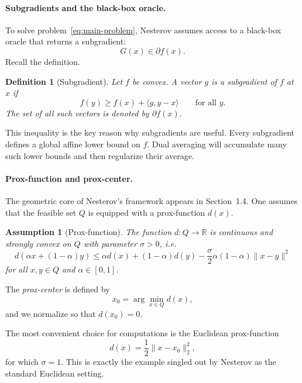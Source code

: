 \documentclass[12pt,a4paper]{article}
\newtheorem{definition}{Definition}
\newtheorem{assumption}{Assumption}
\begin{document}
\paragraph{Subgradients and the black-box oracle.}
To solve problem~\eqref{eq:main-problem}, Nesterov assumes access to a black-box oracle that returns a subgradient:
\begin{equation}
    G(x) \in \partial f(x).
\end{equation}
Recall the definition.

\begin{definition}[Subgradient]
Let $f$ be convex. A vector $g$ is a subgradient of $f$ at $x$ if
\begin{equation}
    f(y) \ge f(x) + \langle g, y-x \rangle \qquad \text{for all } y.
\end{equation}
The set of all such vectors is denoted by $\partial f(x)$.
\end{definition}

This inequality is the key reason why subgradients are useful. Every subgradient defines a global affine lower bound on $f$. Dual averaging will accumulate many such lower bounds and then regularize their average.

\paragraph{Prox-function and prox-center.}
The geometric core of Nesterov's framework appears in Section~1.4. One assumes that the feasible set $Q$ is equipped with a prox-function $d(x)$.

\begin{assumption}[Prox-function]
The function $d:Q \to \mathbb{R}$ is continuous and strongly convex on $Q$ with parameter $\sigma>0$, i.e.
\begin{equation}
    d(\alpha x + (1-\alpha)y)
    \le
    \alpha d(x) + (1-\alpha)d(y) - \frac{\sigma}{2}\alpha(1-\alpha)\|x-y\|^2
\end{equation}
for all $x,y \in Q$ and $\alpha \in [0,1]$.
\end{assumption}

The \emph{prox-center} is defined by
\begin{equation}
    x_0 = \arg\min_{x \in Q} d(x),
\end{equation}
and we normalize so that $d(x_0)=0$.

The most convenient choice for computations is the Euclidean prox-function
\begin{equation}
    d(x) = \frac12 \|x-x_0\|_2^2,
\end{equation}
for which $\sigma = 1$. This is exactly the example singled out by Nesterov as the standard Euclidean setting.
\end{document}
